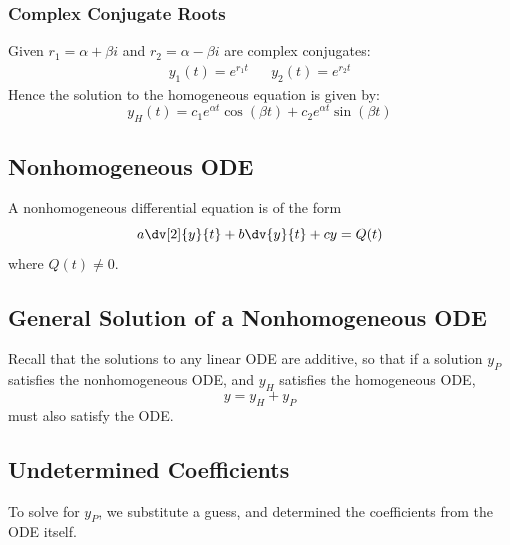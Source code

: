 \documentclass{article}
\begin{document}
\subsubsection{Complex Conjugate Roots}
Given \(r_1 = \alpha + \beta i\) and \(r_2 = \alpha - \beta i\) are complex conjugates:
\begin{align*}
    y_1(t) = e^{r_1t} &  & y_2(t) = e^{r_2t}
\end{align*}
Hence the solution to the homogeneous equation is given by:
\begin{equation*}
    y_H(t) = c_1e^{\alpha t}\cos{\left( \beta t \right)} + c_2e^{\alpha t}\sin{\left( \beta t \right)}
\end{equation*}
\subsection{Nonhomogeneous ODE}
A nonhomogeneous differential equation is of the form
\begin{equation*}
    a \dv[2]{y}{t} + b \dv{y}{t} + c y = Q(t)
\end{equation*}
where \(Q(t)\neq 0\).
\subsection{General Solution of a Nonhomogeneous ODE}
Recall that the solutions to any linear ODE are additive, so that if a solution \(y_P\) satisfies
the nonhomogeneous ODE, and \(y_H\) satisfies the homogeneous ODE,
\begin{equation*}
    y = y_H + y_P
\end{equation*}
must also satisfy the ODE\@.
\subsection{Undetermined Coefficients}
To solve for \(y_P\), we substitute a guess, and
determined the coefficients from the ODE itself.
\end{document}
